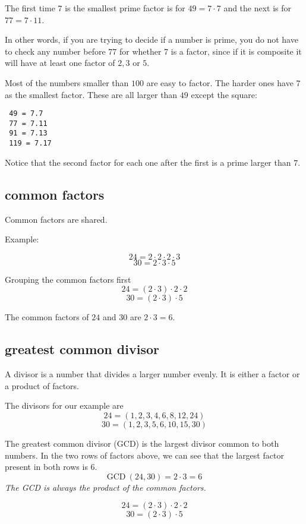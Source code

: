 \documentclass[11pt, oneside]{article}
\begin{document}
The first time $7$ is the smallest prime factor is for $49 = 7 \cdot 7$ and the next is for $77 = 7 \cdot 11$.  

In other words, if you are trying to decide if a number is prime, you do not have to check any number before $77$ for whether $7$ is a factor, since if it is composite it will have at least one factor of $2, 3$ or $5$.

Most of the numbers smaller than $100$ are easy to factor.  The harder ones have $7$ as the smallest factor.  These are all larger than $49$ except the square:

\begin{verbatim}
 49 = 7.7
 77 = 7.11
 91 = 7.13
 119 = 7.17
\end{verbatim}

Notice that the second factor for each one after the first is a prime larger than $7$.

\subsection*{common factors}

Common factors are shared.

Example:

\[ 24 = 2 \cdot 2 \cdot 2 \cdot 3 \]
\[ 30 = 2 \cdot 3 \cdot 5 \]

Grouping the common factors first
\[ 24 = (2 \cdot 3) \cdot 2 \cdot 2 \]
\[ 30 = (2 \cdot 3) \cdot 5 \]

The common factors of $24$ and $30$ are $2 \cdot 3 = 6$.  

\subsection*{greatest common divisor}

A divisor is a number that divides a larger number evenly.  It is either a factor or a product of factors.

The divisors for our example are
\[ 24 = (1, 2, 3, 4, 6, 8, 12, 24) \]
\[ 30 = (1, 2, 3, 5, 6, 10, 15, 30) \]

The greatest common divisor (GCD) is the largest divisor common to both numbers.  In the two rows of factors above, we can see that the largest factor present in both rows is $6$.  
\[ \text{GCD} \ (24,30) = 2 \cdot 3 = 6 \]
\emph{The GCD is always the product of the common factors.}

\[ 24 = (2 \cdot 3) \cdot 2 \cdot 2 \]
\[ 30 = (2 \cdot 3) \cdot 5 \]
\end{document}
